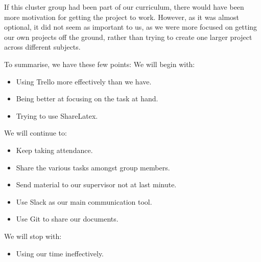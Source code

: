 \documentclass{article}
\begin{document}
If this cluster group had been part of our curriculum, there would have been more motivation for getting the project to work. However, as it was almost optional, it did not seem as important to us, as we were more focused on getting our own projects off the ground, rather than trying to create one larger project across different subjects.
\vspace{12pt}

To summarise, we have these few points:
We will begin with:
\begin{itemize}
\item Using Trello more effectively than we have.
\item Being better at focusing on the task at hand.
\item Trying to use ShareLatex.
\end{itemize}

We will continue to:
\begin{itemize}
\item Keep taking attendance.
\item Share the various tasks amongst group members.
\item Send material to our supervisor not at last minute.
\item Use Slack as our main communication tool.
\item Use Git to share our documents.
\end{itemize}

We will stop with:
\begin{itemize}
\item Using our time ineffectively.
\end{itemize}
\end{document}
